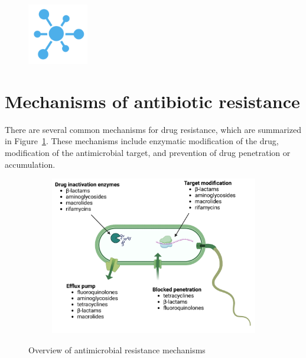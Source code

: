 \documentclass[
  letterpaper,
  DIV=11,
  numbers=noendperiod]{scrreprt}
\begin{document}
\begin{figure}

{\centering \includegraphics[width=1.04167in,height=\textheight]{images/breakblue.png}

}

\end{figure}

\hypertarget{mechanisms-of-antibiotic-resistance}{%
\section{Mechanisms of antibiotic
resistance}\label{mechanisms-of-antibiotic-resistance}}

There are several common mechanisms for drug resistance, which are
summarized in Figure~\ref{fig-resistance}. These mechanisms include
enzymatic modification of the drug, modification of the antimicrobial
target, and prevention of drug penetration or accumulation.

\begin{figure}

{\centering 

\begin{figure}

{\centering \includegraphics{images/resistance.png}

}

\end{figure}

}

\caption{\label{fig-resistance}Overview of antimicrobial resistance
mechanisms}

\end{figure}
\end{document}
